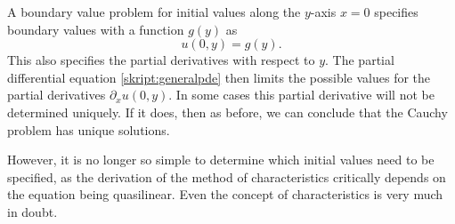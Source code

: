 A boundary value problem for initial values along the $y$-axis
$x=0$ specifies boundary values with a function $g(y)$ as
\[
u(0,y)=g(y).
\]
This also specifies the partial derivatives with respect to $y$.
The partial differential equation \eqref{skript:generalpde} then
limits the possible values for the partial derivatives
$\partial_xu(0,y)$.
In some cases this partial derivative will not be determined uniquely.
If it does, then as before, we can conclude that the Cauchy problem 
has unique solutions.

However, it is no longer so simple to determine which initial values
need to be specified, as the derivation of the method of characteristics
critically depends on the equation being quasilinear.
Even the concept of characteristics is very much in doubt.


